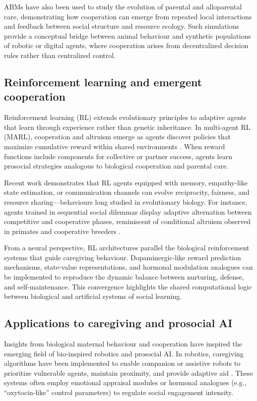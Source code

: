         ABMs have also been used to study the evolution of parental and alloparental care, demonstrating how cooperation can emerge from repeated local interactions and feedback between social structure and resource ecology.  Such simulations provide a conceptual bridge between animal behaviour and synthetic populations of robotic or digital agents, where cooperation arises from decentralized decision rules rather than centralized control.
        
    \subsection{Reinforcement learning and emergent cooperation}

        Reinforcement learning (RL) extends evolutionary principles to adaptive agents that learn through experience rather than genetic inheritance.  In multi-agent RL (MARL), cooperation and altruism emerge as agents discover policies that maximize cumulative reward within shared environments \cite{leibo2017, wang2018}.  When reward functions include components for collective or partner success, agents learn prosocial strategies analogous to biological cooperation and parental care.
        
        Recent work demonstrates that RL agents equipped with memory, empathy-like state estimation, or communication channels can evolve reciprocity, fairness, and resource sharing—behaviours long studied in evolutionary biology.  For instance, agents trained in sequential social dilemmas display adaptive alternation between competitive and cooperative phases, reminiscent of conditional altruism observed in primates and cooperative breeders \cite{hughes2018, jaques2019}.  
        
        From a neural perspective, RL architectures parallel the biological reinforcement systems that guide caregiving behaviour.  Dopaminergic-like reward prediction mechanisms, state-value representations, and hormonal modulation analogues can be implemented to reproduce the dynamic balance between nurturing, defense, and self-maintenance.  This convergence highlights the shared computational logic between biological and artificial systems of social learning.

    \subsection{Applications to caregiving and prosocial AI}
        Insights from biological maternal behaviour and cooperation have inspired the emerging field of bio-inspired robotics and prosocial AI.  In robotics, caregiving algorithms have been implemented to enable companion or assistive robots to prioritize vulnerable agents, maintain proximity, and provide adaptive aid \cite{breazeal2003, kuntoro2022}.  These systems often employ emotional appraisal modules or hormonal analogues (e.g., ``oxytocin-like'' control parameters) to regulate social engagement intensity.
        
